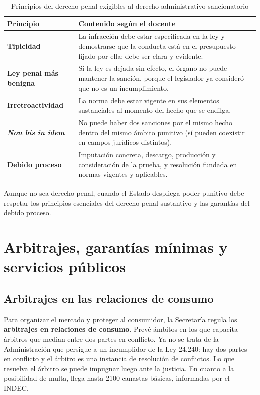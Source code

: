 \documentclass[12pt,oneside]{book}
\begin{document}
\begin{table}[H]
\centering
\caption{Principios del derecho penal exigibles al derecho administrativo sancionatorio}
\small
\begin{tabularx}{\textwidth}{
    >{\raggedright\arraybackslash}p{}
    >{\raggedright\arraybackslash}X
}
\toprule
\textbf{Principio} & \textbf{Contenido según el docente} \\
\midrule
\textbf{Tipicidad} & La infracción debe estar especificada en la ley y demostrarse que la conducta está en el presupuesto fijado por ella; debe ser clara y evidente. \\
\textbf{Ley penal más benigna} & Si la ley es dejada sin efecto, el órgano no puede mantener la sanción, porque el legislador ya consideró que no es un incumplimiento. \\
\textbf{Irretroactividad} & La norma debe estar vigente en sus elementos sustanciales al momento del hecho que se endilga. \\
\textbf{\textit{Non bis in idem}} & No puede haber dos sanciones por el mismo hecho dentro del mismo ámbito punitivo (sí pueden coexistir en campos jurídicos distintos). \\
\textbf{Debido proceso} & Imputación concreta, descargo, producción y consideración de la prueba, y resolución fundada en normas vigentes y aplicables. \\
\bottomrule
\end{tabularx}
\end{table}

\begin{important}
Aunque no sea derecho penal, cuando el Estado despliega poder punitivo debe respetar los principios esenciales del derecho penal sustantivo y las garantías del debido proceso.
\end{important}

\section{Arbitrajes, garantías mínimas y servicios públicos}

\subsection{Arbitrajes en las relaciones de consumo}

Para organizar el mercado y proteger al consumidor, la Secretaría regula los \textbf{arbitrajes en relaciones de consumo}. Prevé ámbitos en los que capacita árbitros que median entre dos partes en conflicto. Ya no se trata de la Administración que persigue a un incumplidor de la Ley 24.240: hay dos partes en conflicto y el árbitro es una instancia de resolución de conflictos. Lo que resuelva el árbitro se puede impugnar luego ante la justicia. En cuanto a la posibilidad de multa, llega hasta 2100 canastas básicas, informadas por el INDEC.
\end{document}
